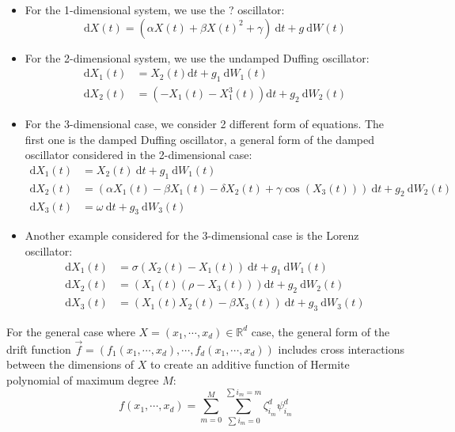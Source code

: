 \documentclass[12pt]{article}
\begin{document}
\begin{itemize}
\item For the 1-dimensional system, we use the ? oscillator:
\begin{equation}
\mathrm{d}X(t) = (\alpha X(t) + \beta X(t)^2 + \gamma) \: \mathrm{d}t + g \: \mathrm{d}W(t)
\end{equation}
\item For the 2-dimensional system, we use the undamped Duffing oscillator:
\begin{align*}
\mathrm{d}X_1(t) & = X_2(t) \mathrm{d}t + g_1 \: \mathrm{d} W_1(t) \\
\mathrm{d}X_2(t) & = (-X_1(t) - X^3_1(t)) \mathrm{d}t + g_2 \: \mathrm{d} W_2(t)
\end{align*}
\item For the 3-dimensional case, we consider 2 different form of equations. The first one is the damped Duffing oscillator, a general form of the damped oscillator considered in the 2-dimensional case:
\begin{align*}
\mathrm{d}X_1(t) & = X_2(t) \: \mathrm{d}t + g_1 \: \mathrm{d}W_1(t) \\
\mathrm{d}X_2(t) & = (\alpha X_1(t) - \beta X_1(t) - \delta X_2(t) + \gamma \cos (X_3(t))) \: \mathrm{d}t + g_2 \: \mathrm{d}W_2(t) \\
\mathrm{d}X_3(t) & = \omega \: \mathrm{d}t + g_3 \: \mathrm{d}W_3(t)
\end{align*}
\item Another example considered for the 3-dimensional case is the Lorenz oscillator:
\begin{align*}
\mathrm{d}X_1(t) & = \sigma (X_2(t) - X_1(t)) \: \mathrm{d}t + g_1 \: \mathrm{d}W_1(t) \\
\mathrm{d}X_2(t) & = (X_1(t) (\rho - X_3(t))) \mathrm{d}t + g_2 \: \mathrm{d}W_2(t) \\
\mathrm{d}X_3(t) & = (X_1(t) X_2(t) - \beta X_3(t)) \: \mathrm{d}t + g_3 \: \mathrm{d}W_3(t)
\end{align*}
\end{itemize}
For the general case where $X = (x_1, \cdots, x_d) \in \mathbb{R}^d$ case, the general form of the drift function $\vec{f} = (f_1(x_1, \cdots, x_d), \cdots, f_d(x_1, \cdots, x_d))$ includes cross interactions between the dimensions of $X$ to create an additive function of Hermite polynomial of maximum degree $M$:
\begin{equation}
f(x_1, \cdots, x_d) = \sum_{m = 0}^{M} \sum_{\sum i_m = 0}^{\sum i_m = m} \zeta_{i_m}^d \psi_{i_m}^d 
\end{equation}
\end{document}

